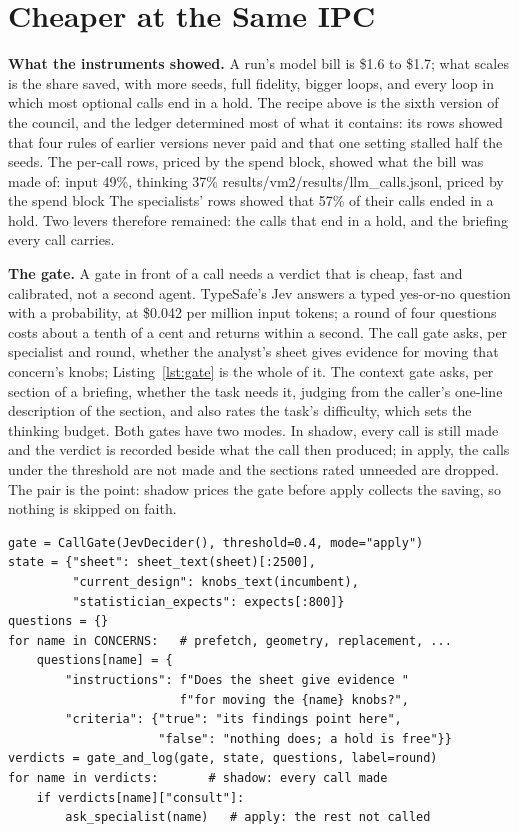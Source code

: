 \documentclass[conference]{IEEEtran}
\begin{document}
\section{Cheaper at the Same IPC}\label{sec:gates}
\textbf{What the instruments showed.} A run's model bill is \$1.6 to \$1.7; what scales is the
share saved, with more seeds, full fidelity, bigger loops, and every loop in which most optional
calls end in a hold. The recipe above is the sixth version of the council, and the ledger
determined most of what it contains: its rows showed that four rules of earlier versions never
paid and that one setting stalled half the seeds. %
The per-call rows, priced by the spend block, showed what the bill was made of: input 49\%,
thinking 37\% results/vm2/results/llm_calls.jsonl, priced by the spend block
The specialists' rows showed that 57\% of their calls ended in a hold. %
Two levers therefore remained: the calls that end in a hold, and the briefing every call carries.

\textbf{The gate.} A gate in front of a call needs a verdict that is cheap, fast and calibrated,
not a second agent. TypeSafe's Jev \cite{typesafe} answers a typed yes-or-no question with a
probability, at \$0.042 per million input tokens; a round of four questions costs about a tenth
of a cent and returns within a second. %
The call gate asks, per specialist and round, whether the analyst's sheet gives evidence for
moving that concern's knobs; Listing~\ref{lst:gate} is the whole of it. The context gate asks,
per section of a briefing, whether the task needs it, judging from the caller's one-line
description of the section, and also rates the task's difficulty, which sets the thinking
budget. Both gates have two modes. In shadow, every call is still made and the verdict is
recorded beside what the call then produced; in apply, the calls under the threshold are not made
and the sections rated unneeded are dropped. The pair is the point: shadow prices the gate before
apply collects the saving, so nothing is skipped on faith.

\begin{lstlisting}[caption={The call gate in front of the council's specialists. The state and the questions belong to the loop, the rest to the block; \texttt{ask\_specialist} is one task of the Gemini node.},label={lst:gate},float=t]
gate = CallGate(JevDecider(), threshold=0.4, mode="apply")
state = {"sheet": sheet_text(sheet)[:2500],
         "current_design": knobs_text(incumbent),
         "statistician_expects": expects[:800]}
questions = {}
for name in CONCERNS:   # prefetch, geometry, replacement, ...
    questions[name] = {
        "instructions": f"Does the sheet give evidence "
                        f"for moving the {name} knobs?",
        "criteria": {"true": "its findings point here",
                     "false": "nothing does; a hold is free"}}
verdicts = gate_and_log(gate, state, questions, label=round)
for name in verdicts:       # shadow: every call made
    if verdicts[name]["consult"]:
        ask_specialist(name)   # apply: the rest not called
\end{lstlisting}
\end{document}
